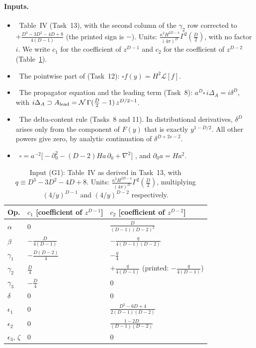 \paragraph{Inputs.}
\begin{itemize}[leftmargin=*,itemsep=2pt]
\item[(G1)] \tD\ Table~IV (Task~13), with the second column of the $\gamma_2$ row corrected to $+\frac{D^3-3D^2-4D+8}{4(D-1)}$
(the printed sign is $-$). Units: $\frac{\kappa^2H^{2D-4}}{(4\pi)^D}\Gamma^2(\tfrac D2)$, with no factor $i$.
We write $c_1$ for the coefficient of $z^{D-1}$ and $c_2$ for the coefficient of $z^{D-2}$ (Table~\ref{tab:ch08-T4}).
\item[(G2)] \tD\ The pointwise part of  (Task~12): $\square f(y)=H^2\mathcal L[f]$.
\item[(G3)] \tP\tD\ The propagator equation  and the leading term (Task~8): $a^D\square\,i\Delta_A=i\delta^D$, with
$i\Delta_A\supset A_{\rm lead}=\mathcal N\,\Gamma(\tfrac D2-1)\,z^{D/2-1}$.
\item[(G4)] \tD\ The delta-content rule (Tasks~8 and 11). In distributional derivatives, $\delta^D$ arises only from the component of $F(y)$ that is exactly $y^{1-D/2}$.
All other powers give zero, by analytic continuation of $\delta^{D+2s-2}$.
\item[(G5)] \tD\ $\square=a^{-2}\big[-\partial_0^2-(D-2)Ha\,\partial_0+\nabla^2\big]$ , and $\partial_0a=Ha^2$.
\end{itemize}

\begin{table}[ht]
\centering\small
\renewcommand{\arraystretch}{1.35}
\begin{tabular}{lll}
\toprule
Op. & $c_1$ [coefficient of $z^{D-1}$] & $c_2$ [coefficient of $z^{D-2}$] \\
\midrule
$\alpha$ & $0$ & $\frac{D}{(D-1)(D-2)^2}$ \\
$\beta$ & $-\frac{D}{4(D-1)}$ & $-\frac{q}{4(D-1)(D-2)}$ \\
$\gamma_1$ & $-\frac{D(D-2)}{4}$ & $-\frac{q}{4}$ \\
$\gamma_2$ & $\frac D4$ & $+\frac{q}{4(D-1)}$ \quad(printed: $-\frac{q}{4(D-1)}$) \\
$\gamma_3$ & $-\frac D4$ & $0$ \\
$\delta$ & $0$ & $0$ \\
$\epsilon_1$ & $0$ & $\frac{D^2-6D+4}{2(D-1)(D-2)}$ \\
$\epsilon_2$ & $0$ & $\frac{1-2D}{(D-1)(D-2)}$ \\
$\epsilon_3$, $\zeta$ & $0$ & $0$ \\
\bottomrule
\end{tabular}
\caption{Input (G1): Table~IV as derived in Task~13, with $q\equiv D^3-3D^2-4D+8$.
Units: $\frac{\kappa^2H^{2D-4}}{(4\pi)^D}\Gamma^2(\frac D2)$, multiplying $(4/y)^{D-1}$ and $(4/y)^{D-2}$ respectively.}
\label{tab:ch08-T4}
\end{table}


